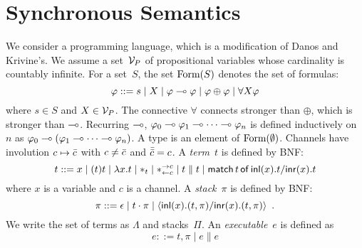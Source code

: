 


\section{Synchronous Semantics}


\newcommand{\conc}{\parallel}
\newcommand{\comod}[2]{\ast^{\rightarrow {#2}}_{\leftarrow{#1}}}
\newcommand{\reader}[1]{\ast_{\leftarrow{#1}}}

We consider a programming language, which is a modification of
Danos and Krivine's.
We assume a set~$\mathcal V_P$ of propositional variables whose cardinality is
countably infinite.
For a set~$S$,
the set $\mathop{\text{Form}}(S)$ denotes the set of formulas:
\[
\varphi::= s \mid X \mid \varphi\multimap\varphi\mid \varphi\oplus\varphi\mid
\forall X \varphi
\]
where $s\in S$ and $X\in \mathcal V_P$.
The connective $\forall$ connects stronger than $\oplus$, which is
stronger than $\multimap$.
Recurring $\multimap$,
$\varphi_0\multimap\varphi_1\multimap\cdots\multimap\varphi_n$ is defined inductively on~$n$
as
$\varphi_0\multimap(\varphi_1\multimap\cdots\multimap\varphi_n)$.
A type is an element of $\mathop{\text{Form}}(\emptyset)$.
Channels have involution $c\mapsto\bar{c}$ with
$c\neq \bar{c}$ and
$\bar{\bar{c}} = c$.
A \textit{term}~$t$ is defined by BNF:
\[
 t::= x
 \mid (t)t
 \mid \lambda x.t
 \mid \ast_t
 \mid \comod c c
 \mid t\conc t
 \mid \mat t x t x t
\]
where $x$ is a variable and $c$ is a channel.
A \textit{stack}~$\pi$ is defined by BNF:
\[
 \pi ::= \epsilon
 \mid t\cdot \pi
 \mid \langle \mathsf{inl}({x}). ({t},{\pi})/ \mathsf{inr}({x}). ({t},{\pi})\rangle
 \enspace.
\]
We write the set of terms as $\Lambda$ and stacks~$\Pi$.
An \textit{executable}~$e$ is defined as
\[
 e::= t,\pi\mid e\conc e
\]

